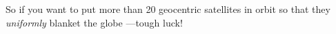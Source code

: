 So if you want to put more than 20 geocentric satellites in orbit so that
they \emph{uniformly} blanket the globe ---tough luck!

\begin{problems}

\examproblems
{}

\classproblems
{}

\homeworkproblems  
{}

\end{problems}


\endinput
